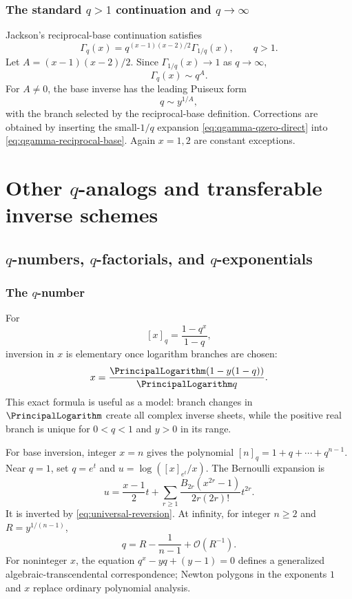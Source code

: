 \documentclass[11pt,oneside]{book}
\theoremstyle{definition}
\theoremstyle{remark}
\newcommand{\OO}{\mathcal{O}}
\begin{document}
\section{The standard $q>1$ continuation and $q\to\infty$}
Jackson's reciprocal-base continuation satisfies
\begin{equation}\label{eq:qgamma-reciprocal-base}
 \Gamma_q(x)=q^{(x-1)(x-2)/2}\Gamma_{1/q}(x),
 \qquad q>1.
\end{equation}
Let
$A=(x-1)(x-2)/2$.  Since $\Gamma_{1/q}(x)\to1$ as $q\to\infty$,
\begin{equation}\label{eq:qgamma-infty-leading}
 \Gamma_q(x)\sim q^A.
\end{equation}
For $A\ne0$, the base inverse has the leading Puiseux form
\begin{equation}\label{eq:qgamma-infty-inverse}
 q\sim y^{1/A},
\end{equation}
with the branch selected by the reciprocal-base definition.  Corrections are
obtained by inserting the small-$1/q$ expansion
\eqref{eq:qgamma-qzero-direct} into \eqref{eq:qgamma-reciprocal-base}.  Again
$x=1,2$ are constant exceptions.

\part{Other $q$-analogs and transferable inverse schemes}

\chapter{$q$-numbers, $q$-factorials, and $q$-exponentials}

\section{The $q$-number}
For
\[
 [x]_q=\frac{1-q^x}{1-q},
\]
inversion in $x$ is elementary once logarithm branches are chosen:
\begin{equation}\label{eq:qnumber-xinverse}
 x=\frac{\PrincipalLogarithm(1-y(1-q))}{\PrincipalLogarithm q}.
\end{equation}
This exact formula is useful as a model: branch changes in $\PrincipalLogarithm$ create all
complex inverse sheets, while the positive real branch is unique for
$0<q<1$ and $y>0$ in its range.

For base inversion, integer $x=n$ gives the polynomial
$[n]_q=1+q+\cdots+q^{n-1}$.  Near $q=1$, set $q=e^t$ and
$u=\log([x]_{e^t}/x)$.  The Bernoulli expansion is
\begin{equation}\label{eq:qnumber-log-expansion}
 u=\frac{x-1}{2}t+
 \sum_{r\ge1}\frac{B_{2r}(x^{2r}-1)}{2r(2r)!}t^{2r}.
\end{equation}
It is inverted by \eqref{eq:universal-reversion}.  At infinity, for integer
$n\ge2$ and $R=y^{1/(n-1)}$,
\begin{equation}\label{eq:qnumber-infty-inverse}
 q=R-\frac1{n-1}+\OO(R^{-1}).
\end{equation}
For noninteger $x$, the equation
$q^x-yq+(y-1)=0$ defines a generalized algebraic-transcendental correspondence;
Newton polygons in the exponents $1$ and $x$ replace ordinary polynomial
analysis.
\end{document}
